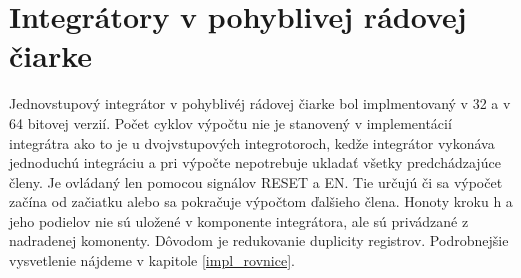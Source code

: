 

\section{Integrátory v pohyblivej rádovej čiarke}
Jednovstupový integrátor v pohyblivéj rádovej čiarke bol implmentovaný v 32 a v 64 bitovej verzií. Počet cyklov výpočtu nie je stanovený v implementácií integrátra ako to je u dvojvstupových integrotoroch, kedže integrátor vykonáva jednoduchú integráciu a pri výpočte nepotrebuje ukladať všetky predchádzajúce členy. Je ovládaný len pomocou signálov RESET a EN. Tie určujú či sa výpočet začína od začiatku alebo sa pokračuje výpočtom ďalšieho člena. Honoty kroku h a jeho podielov nie sú uložené v komponente integrátora, ale sú privádzané z nadradenej komonenty. Dôvodom je redukovanie duplicity registrov. Podrobnejšie vysvetlenie nájdeme v kapitole \ref{impl_rovnice}.


